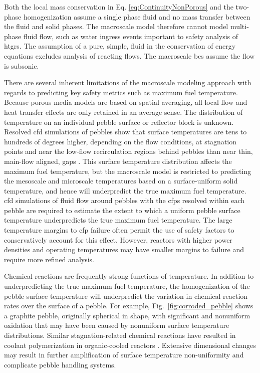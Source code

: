 Both the local mass conservation in Eq. \eqref{eq:ContinuityNonPorous} and the two-phase homogenization assume a single phase fluid and no mass transfer between the fluid and solid phases. The macroscale model therefore cannot model multi-phase fluid flow, such as water ingress events important to safety analysis of \glspl{htgr}. The assumption of a pure, simple, fluid in the conservation of energy equations excludes analysis of reacting flows. The macroscale \glspl{bc} assume the flow is subsonic. 

There are several inherent limitations of the macroscale modeling approach with regards to predicting key safety metrics such as maximum fuel temperature. Because porous media models are based on spatial averaging, all local flow and heat transfer effects are only retained in an average sense. The distribution of temperature on an individual pebble surface or reflector block is unknown. Resolved \gls{cfd} simulations of pebbles show that surface temperatures are tens to hundreds of degrees higher, depending on the flow conditions, at stagnation points and near the low-flow recirculation regions behind pebbles than near thin, main-flow aligned, gaps \cite{bai,ferng,ge,lee2007,song,wu2010}. This surface temperature distribution affects the maximum fuel temperature, but the macroscale model is restricted to predicting the mesoscale and microscale temperatures based on a surface-uniform solid temperature, and hence will underpredict the true maximum fuel temperature. \gls{cfd} simulations of fluid flow around pebbles with the \glspl{cfp} resolved within each pebble are required to estimate the extent to which a uniform pebble surface temperature underpredicts the true maximum fuel temperature. The large temperature margins to \gls{cfp} failure often permit the use of safety factors to conservatively account for this effect. However, reactors with higher power densities and operating temperatures may have smaller margins to failure and require more refined analysis.

Chemical reactions are frequently strong functions of temperature. In addition to underpredicting the true maximum fuel temperature, the homogenization of the pebble surface temperature will underpredict the variation in chemical reaction rates over the surface of a pebble. For example, Fig.\ \ref{fig:corroded_pebble} shows a graphite pebble, originally spherical in shape, with significant and nonuniform oxidation that may have been caused by nonuniform surface temperature distributions. Similar stagnation-related chemical reactions have resulted in coolant polymerization in organic-cooled reactors \cite{shirvan}. Extensive dimensional changes may result in further amplification of surface temperature non-uniformity and complicate pebble handling systems. 

